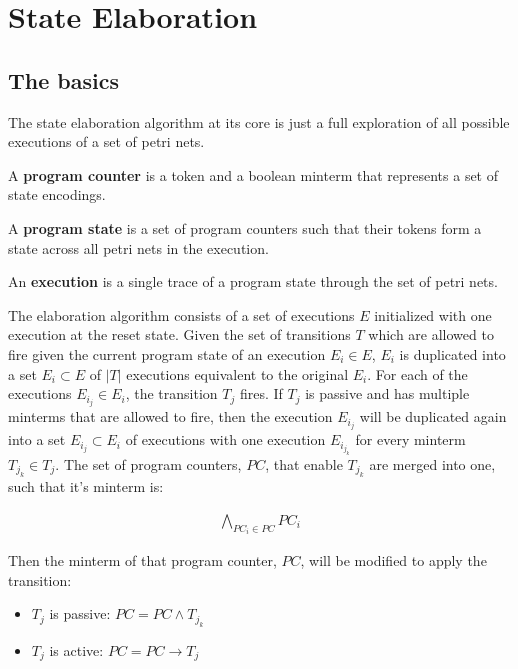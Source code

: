 \section{State Elaboration}

\subsection{The basics}

The state elaboration algorithm at its core is just a full exploration of all possible executions of a set of petri nets.

\begin{definition}
A \textbf{program counter} is a token and a boolean minterm that represents a set of state encodings.
\end{definition}

\begin{definition}
A \textbf{program state} is a set of program counters such that their tokens form a state across all petri nets in the execution.
\end{definition}

\begin{definition}
An \textbf{execution} is a single trace of a program state through the set of petri nets.
\end{definition}

The elaboration algorithm consists of a set of executions $E$ initialized with one execution at the reset state. Given the set of transitions $T$ which are allowed to fire given the current program state of an execution $E_i \in E$, $E_i$ is duplicated into a set $E_i \subset E$ of $|T|$ executions equivalent to the original $E_i$. For each of the executions $E_{i_j} \in E_i$, the transition $T_j$ fires. If $T_j$ is passive and has multiple minterms that are allowed to fire, then the execution $E_{i_j}$ will be duplicated again into a set $E_{i_j} \subset E_i$ of executions with one execution $E_{i_{j_k}}$ for every minterm $T_{j_k} \in T_j$. The set of program counters, $PC$, that enable $T_{j_k}$ are merged into one, such that it's minterm is:

\begin{align}
\bigwedge_{PC_i \in PC} PC_i
\end{align}

Then the minterm of that program counter, $PC$, will be modified to apply the transition:

\begin{itemize}
\item $T_j$ is passive: $PC = PC \wedge T_{j_k}$
\item $T_j$ is active: $PC = PC \rightarrow T_j$
\end{itemize}

